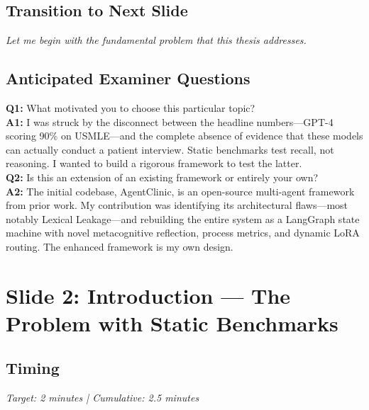 \documentclass[12pt]{article}
\begin{document}
  \subsection*{Transition to Next Slide}
  {\color{transgreen}
  \textit{Let me begin with the fundamental problem that this thesis addresses.}
  }

  \subsection*{Anticipated Examiner Questions}
  \begin{qabox}
  \textbf{Q1:} What motivated you to choose this particular topic? \\
  \textbf{A1:} I was struck by the disconnect between the headline numbers---GPT-4 scoring 90\% on USMLE---and the complete absence of evidence that these models can actually conduct a patient interview. Static benchmarks test recall, not reasoning. I wanted to build a rigorous framework to test the latter. \\[6pt]
  \textbf{Q2:} Is this an extension of an existing framework or entirely your own? \\
  \textbf{A2:} The initial codebase, AgentClinic, is an open-source multi-agent framework from prior work. My contribution was identifying its architectural flaws---most notably Lexical Leakage---and rebuilding the entire system as a LangGraph state machine with novel metacognitive reflection, process metrics, and dynamic LoRA routing. The enhanced framework is my own design.
  \end{qabox}



  \section{Slide 2: Introduction --- The Problem with Static Benchmarks}

  \subsection*{Timing}
  \textit{Target: 2 minutes | Cumulative: 2.5 minutes}
\end{document}
